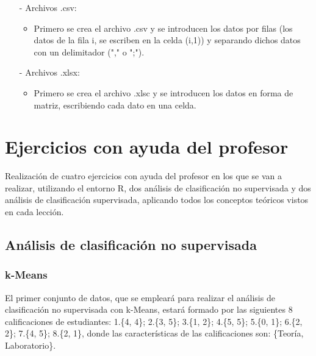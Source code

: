 \documentclass[a4paper, 12pt]{article}
\begin{document}
	\begin{itemize}
		\item[-] Archivos .csv:
		\begin{itemize}
			\item Primero se crea el archivo .csv y se introducen los datos por filas (los datos de la fila i, se escriben en la celda (i,1)) y separando dichos datos con un delimitador ("," o ";").
		\end{itemize}
		
		\item[-] Archivos .xlsx:
		\begin{itemize}
			\item Primero se crea el archivo .xlsc y se introducen los datos en forma de matriz, escribiendo cada dato en una celda.
		\end{itemize}
	\end{itemize}
	
	
  \newpage
	
	\section{Ejercicios con ayuda del profesor}
	Realización de cuatro ejercicios con ayuda del profesor en los que se van a realizar, utilizando el entorno R, dos análisis de clasificación no supervisada y dos análisis de clasificación supervisada, aplicando todos los conceptos teóricos vistos en cada lección.

	\subsection{Análisis de clasificación no supervisada}
	
	\subsubsection{k-Means}
	
	El primer conjunto de datos, que se empleará para realizar el análisis de clasificación no supervisada con k-Means, estará formado por las siguientes 8 calificaciones de estudiantes: 1.\{4, 4\}; 2.\{3, 5\}; 3.\{1, 2\}; 4.\{5, 5\}; 5.\{0, 1\}; 6.\{2, 2\}; 7.\{4, 5\}; 8.\{2, 1\}, donde las características de las calificaciones son: \{Teoría, Laboratorio\}.
	
\end{document}
